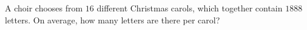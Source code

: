 A choir chooses from $16$ different Christmas carols, which together contain $1888$ letters. On average, how many letters are there per carol?
